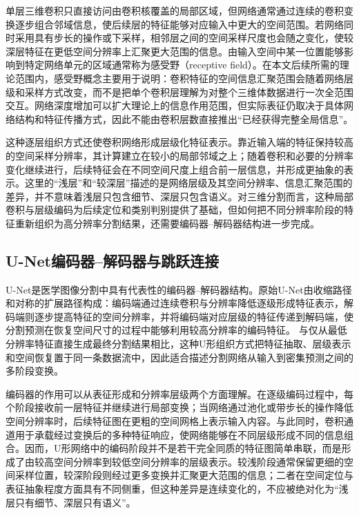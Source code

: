 单层三维卷积只直接访问由卷积核覆盖的局部区域，但网络通常通过连续的卷积变换逐步组合邻域信息，使后续层的特征能够对应输入中更大的空间范围。若网络同时采用具有步长的操作或下采样，相邻层之间的空间采样尺度也会随之变化，使较深层特征在更低空间分辨率上汇聚更大范围的信息。由输入空间中某一位置能够影响到特定网络单元的区域通常称为感受野（receptive field）。在本文后续所需的理论范围内，感受野概念主要用于说明：卷积特征的空间信息汇聚范围会随着网络层级和采样方式改变，而不是把单个卷积层理解为对整个三维体数据进行一次全范围交互。网络深度增加可以扩大理论上的信息作用范围，但实际表征仍取决于具体网络结构和特征传播方式，因此不能由卷积层数直接推出“已经获得完整全局信息”。

这种逐层组织方式还使卷积网络形成层级化特征表示。靠近输入端的特征保持较高的空间采样分辨率，其计算建立在较小的局部邻域之上；随着卷积和必要的分辨率变化继续进行，后续特征会在不同空间尺度上组合前一层信息，并形成更抽象的表示。这里的“浅层”和“较深层”描述的是网络层级及其空间分辨率、信息汇聚范围的差异，并不意味着浅层只包含细节、深层只包含语义。对三维分割而言，这种局部卷积与层级编码为后续定位和类别判别提供了基础，但如何把不同分辨率阶段的特征重新组织为高分辨率分割结果，还需要编码器--解码器结构进一步完成。

\subsection{U-Net编码器--解码器与跳跃连接}

U-Net是医学图像分割中具有代表性的编码器--解码器结构。原始U-Net由收缩路径和对称的扩展路径构成：编码端通过连续卷积与分辨率降低逐级形成特征表示，解码端则逐步提高特征的空间分辨率，并将编码端对应层级的特征传递到解码端，使分割预测在恢复空间尺寸的过程中能够利用较高分辨率的编码特征。\cite{ronneberger2015unet} 与仅从最低分辨率特征直接生成最终分割结果相比，这种U形组织方式把特征抽取、层级表示和空间恢复置于同一条数据流中，因此适合描述分割网络从输入到密集预测之间的多阶段变换。

编码器的作用可以从表征形成和分辨率层级两个方面理解。在逐级编码过程中，每个阶段接收前一层特征并继续进行局部变换；当网络通过池化或带步长的操作降低空间分辨率时，后续特征图在更粗的空间网格上表示输入内容。与此同时，卷积通道用于承载经过变换后的多种特征响应，使网络能够在不同层级形成不同的信息组合。因而，U形网络中的编码阶段并不是若干完全同质的特征图简单串联，而是形成了由较高空间分辨率到较低空间分辨率的层级表示。较浅阶段通常保留更细的空间采样位置，较深阶段则经过更多变换并汇聚更大范围的信息；二者在空间定位与表征抽象程度方面具有不同侧重，但这种差异是连续变化的，不应被绝对化为“浅层只有细节、深层只有语义”。

